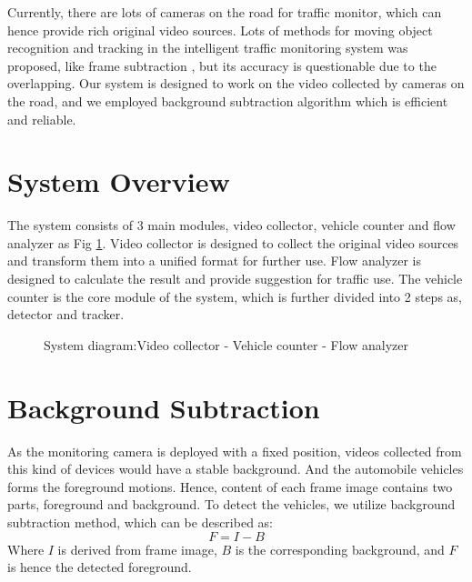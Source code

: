\documentclass[draftclsnofoot,onecolumn]{IEEEtran}
\begin{document}
	Currently, there are lots of cameras on the road for traffic monitor, which can hence provide rich original video sources. Lots of methods for moving object recognition and tracking in the intelligent traffic monitoring system was proposed, like frame subtraction \cite{singla2014motion}, but its accuracy is questionable due to the overlapping. Our system is designed to work on the video collected by cameras on the road, and we employed background subtraction algorithm \cite{sobral2014comprehensive} which is efficient and reliable.
	


\section{System Overview}
	The system consists of 3 main modules, video collector, vehicle counter and flow analyzer as Fig \ref{fig:sysDiagram}. Video collector is designed to collect the original video sources and transform them into a unified format for further use. Flow analyzer is designed to calculate the result and provide suggestion for traffic use. The vehicle counter is the core module of the system, which is further divided into 2 steps as, detector and tracker. 	
	\begin{figure}[!ht]
	\centering
	\caption{System diagram:Video collector - Vehicle counter - Flow analyzer}
	\label{fig:sysDiagram}
	\end{figure}
	
	
	\section{Background Subtraction}
	As the monitoring camera is deployed with a fixed position, videos collected from this kind of devices would have a stable background. And the automobile vehicles forms the foreground motions. Hence, content of each frame image contains two parts, foreground and background. To detect the vehicles, we utilize background subtraction method, which can be described as:
	\begin{equation}
	F = I  - B
	\label{eq:backgroundSubtraction}
	\end{equation}
	Where $I$ is derived from frame image, $B$ is the corresponding background, and $F$ is hence the detected foreground.
	
\end{document}

